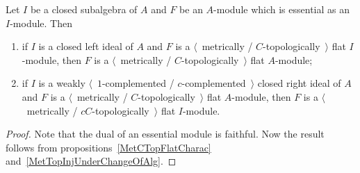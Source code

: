 \begin{proposition}\label{MetTopFlatUnderChangeOfAlg} Let $I$ be a closed
subalgebra of $A$ and $F$ be an $A$-module which is essential as an $I$-module.
Then

\begin{enumerate}[label = (\roman*)]
    \item if $I$ is a closed left ideal of $A$ and $F$ is a $\langle$~metrically /
    $C$-topologically~$\rangle$  flat $I$-module, then $F$ is a 
    $\langle$~metrically / $C$-topologically~$\rangle$ flat $A$-module;

    \item if $I$ is a weakly $\langle$~$1$-complemented / 
    $c$-complemented~$\rangle$ closed right ideal of $A$ and $F$ 
    is a $\langle$~metrically / $C$-topologically~$\rangle$ flat $A$-module, 
    then $F$ is a $\langle$~metrically / $cC$-topologically~$\rangle$ 
    flat $I$-module.
\end{enumerate}
\end{proposition}
\begin{proof} Note that the dual of an essential module is faithful. Now the result
follows from propositions~\ref{MetCTopFlatCharac} 
and~\ref{MetTopInjUnderChangeOfAlg}.
\end{proof}    

